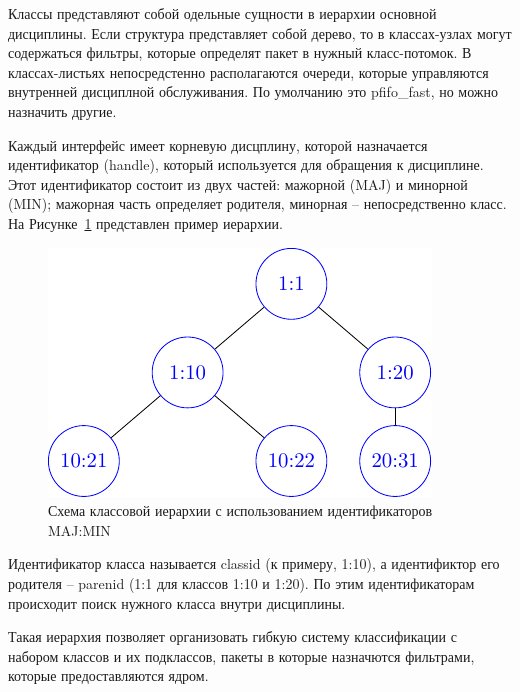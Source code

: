 	Классы представляют собой одельные сущности в иерархии основной дисциплины.
	Если структура представляет собой дерево, то в классах-узлах могут содержаться
	фильтры, которые определят пакет в нужный класс-потомок. В классах-листьях
	непосредстенно располагаются очереди, которые управляются внутренней дисциплной
	обслуживания. По умолчанию это pfifo\_fast, но можно назначить другие. 

	Каждый интерфейс имеет корневую дисцплину, которой
	назначается идентификатор (handle), который используется для обращения к дисциплине.
	Этот идентификатор состоит из двух частей: мажорной (MAJ) и минорной (MIN); мажорная
	часть определяет родителя, минорная -- непосредственно класс. На Рисунке~\ref{pic:clheirh}
	представлен пример иерархии.

	\begin{figure}[ht!]
		\centering
		\includegraphics[scale=1.3]{./pdfimages/class_hierh.pdf}
		\caption{Схема классовой иерархии с использованием идентификаторов MAJ:MIN}
		\label{pic:clheirh}
	\end{figure}

	Идентификатор класса называется classid (к примеру, 1:10),
	а идентификтор его родителя -- parenid (1:1 для классов 1:10 и 1:20). По этим
	идентификаторам происходит поиск нужного класса внутри дисциплины.

	Такая иерархия позволяет организовать гибкую систему классификации с набором классов
	и их подклассов, пакеты в которые назначются фильтрами, которые предоставляются ядром.


